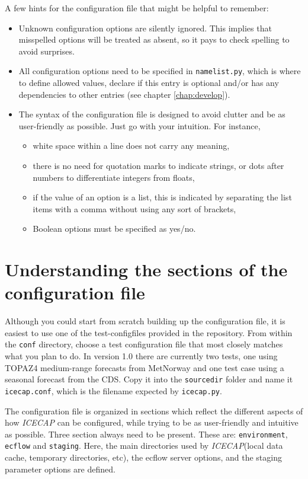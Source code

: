 \documentclass[DIV=10, parskip=full]{scrreprt}
\newcommand{\ice}{\textit{ICECAP}\xspace}
\newcommand{\version}{1.0\xspace}
\begin{document}
A few hints for the configuration file that might be helpful to remember:
\begin{itemize}
 \item Unknown configuration options are silently ignored. This implies that misspelled options will be treated as absent, so it pays to check spelling to avoid surprises.
 \item All configuration options need to be specified in \texttt{namelist.py}, which is where to define allowed values, declare if this entry is optional and/or has any dependencies to other entries (see chapter \ref{chap:develop}).
 \item The syntax of the configuration file is designed to avoid clutter and be as user-friendly as possible. Just go with your intuition. For instance,
 \begin{itemize}
   \item white space within a line does not carry any meaning,
   \item there is no need for quotation marks to indicate strings, or dots after numbers to differentiate integers from floats,
   \item if the value of an option is a list, this is indicated by separating the list items with a comma without using any sort of brackets,
   \item Boolean options must be specified as yes/no.
 \end{itemize}
\end{itemize}


\section{Understanding the sections of the configuration file}
Although you could start from scratch building up the configuration file, it is easiest to use one of the test-configfiles provided in the repository. From within the \texttt{conf} directory, choose a test configuration file that most closely matches what you plan to do. In version \version there are currently two tests, one using TOPAZ4 medium-range forecasts from MetNorway and one test case using a seasonal forecast from the CDS. Copy it into the \texttt{sourcedir} folder and name it \texttt{icecap.conf}, which is the filename expected by \texttt{icecap.py}. 


The configuration file is organized in sections which reflect the different aspects of how \ice can be configured, while trying to be as user-friendly and intuitive as possible. Three section always need to be present. These are: \texttt{environment}, \texttt{ecflow} and \texttt{staging}. Here, the main directories used by \ice (local data cache, temporary directories, etc), the ecflow server options, and the staging parameter options are defined. 
\end{document}
